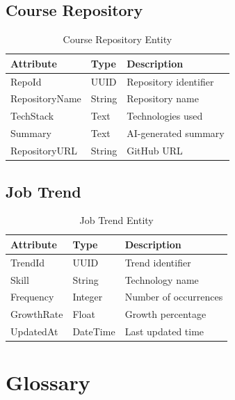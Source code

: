 \subsection{Course Repository}

\begin{table}[H]
\centering
\caption{Course Repository Entity}
\begin{tabular}{|l|l|p{8cm}|}
\hline
Attribute & Type & Description \\ \hline
RepoId & UUID & Repository identifier \\ \hline
RepositoryName & String & Repository name \\ \hline
TechStack & Text & Technologies used \\ \hline
Summary & Text & AI-generated summary \\ \hline
RepositoryURL & String & GitHub URL \\ \hline
\end{tabular}
\end{table}

\subsection{Job Trend}

\begin{table}[H]
\centering
\caption{Job Trend Entity}
\begin{tabular}{|l|l|p{8cm}|}
\hline
Attribute & Type & Description \\ \hline
TrendId & UUID & Trend identifier \\ \hline
Skill & String & Technology name \\ \hline
Frequency & Integer & Number of occurrences \\ \hline
GrowthRate & Float & Growth percentage \\ \hline
UpdatedAt & DateTime & Last updated time \\ \hline
\end{tabular}
\end{table}


\section{Glossary}

